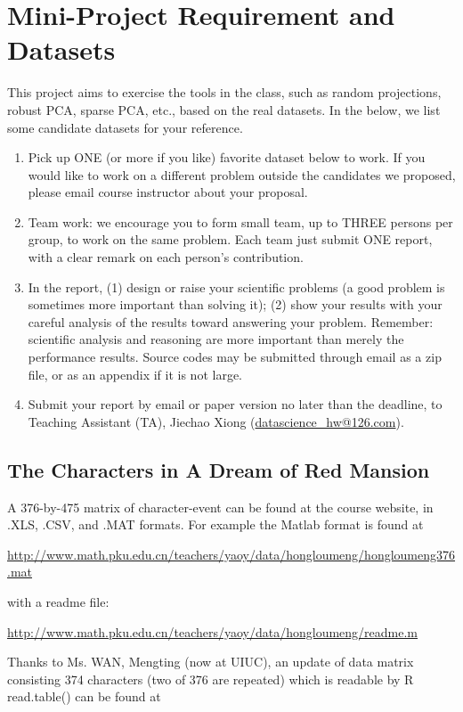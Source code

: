 \documentclass[11pt]{article}
\begin{document}
\section{Mini-Project Requirement and Datasets}

This project aims to exercise the tools in the class, such as random projections, robust PCA, sparse PCA, etc., based on the real datasets. In the below, we list some candidate datasets for your reference. 

\begin{enumerate}
\item Pick up ONE (or more if you like) favorite dataset below to work. If you would like to work on a different problem outside the candidates we proposed, please email course instructor about your proposal.  
\item Team work: we encourage you to form small team, up to THREE persons per group, to work on the same problem. Each team just submit ONE report, with a clear remark on each person's contribution. 
\item In the report, (1) design or raise your scientific problems (a good problem is sometimes more important than solving it); (2) show your results with your careful analysis of the results toward answering your problem. Remember: scientific analysis and reasoning are more important than merely the performance results. Source codes may be submitted through email as a zip file, or as an appendix if it is not large.    
\item Submit your report by email or paper version no later than the deadline, to Teaching Assistant (TA), Jiechao Xiong (\href{mailto:datascience\_hw@126.com}{datascience\_hw@126.com}). 
\end{enumerate}


\subsection{The Characters in A Dream of Red Mansion} 

A 376-by-475 matrix of character-event can be found at the course website, in .XLS, .CSV, and .MAT formats. For example the Matlab format is found at

\url{http://www.math.pku.edu.cn/teachers/yaoy/data/hongloumeng/hongloumeng376.mat} 

\noindent with a readme file:

\url{http://www.math.pku.edu.cn/teachers/yaoy/data/hongloumeng/readme.m}

Thanks to Ms. WAN, Mengting (now at UIUC), an update of data matrix consisting 374 characters (two of 376 are repeated) which is readable by R read.table() can be found at 
\end{document}
